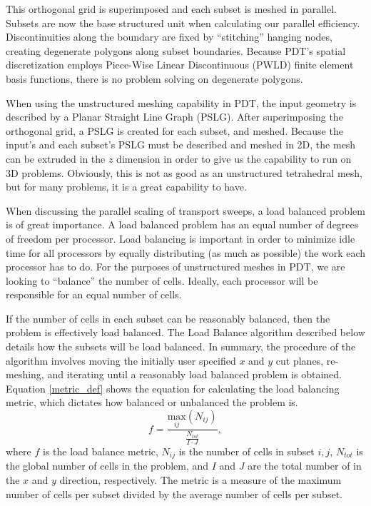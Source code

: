 This orthogonal grid is superimposed and each subset is meshed in parallel.  Subsets are now the base structured unit when calculating our parallel efficiency. Discontinuities along the boundary are fixed by ``stitching'' hanging nodes, creating degenerate polygons along subset boundaries. Because PDT's spatial discretization employs Piece-Wise Linear Discontinuous (PWLD) finite element basis functions, there is no problem solving on degenerate polygons. 

When using the unstructured meshing capability in PDT, the input geometry is described by a Planar Straight Line Graph (PSLG). After superimposing the orthogonal grid, a PSLG is created for each subset, and meshed. Because the input's and each subset's PSLG must be described and meshed in 2D, the mesh can be extruded in the $z$ dimension in order to give us the capability to run on 3D problems. Obviously, this is not as good as an unstructured tetrahedral mesh, but for many problems, it is a great capability to have. 

When discussing the parallel scaling of transport sweeps, a load balanced problem is of great importance. A load balanced problem has an equal number of degrees of freedom per processor. Load balancing is important in order to minimize idle time for all processors by equally distributing (as much as possible) the work each processor has to do.  For the purposes of unstructured meshes in PDT, we are looking to ``balance'' the number of cells. Ideally, each processor will be responsible for an equal number of cells. 

If the number of cells in each subset can be reasonably balanced, then the problem is effectively load balanced. The Load Balance algorithm described below details how the subsets will be load balanced. In summary, the procedure of the algorithm involves moving the initially user specified $x$ and $y$ cut planes, re-meshing, and iterating until a reasonably load balanced problem is obtained.  Equation \ref{metric_def} shows the equation for calculating the load balancing metric, which dictates how balanced or unbalanced the problem is.
\begin{equation}
f =\frac{\underset{ij}{\text{max}}(N_{ij})}{\frac{N_{tot}}{I\cdot J}},
\label{metric_def}
\end{equation}
where $f$ is the load balance metric, $N_{ij}$ is the number of cells in subset $i,j$, $N_{tot}$ is the global number of cells in the problem, and $I$ and $J$ are the total number of in the $x$ and $y$ direction, respectively. The metric is a measure of the maximum number of cells per subset divided by the average number of cells per subset.

